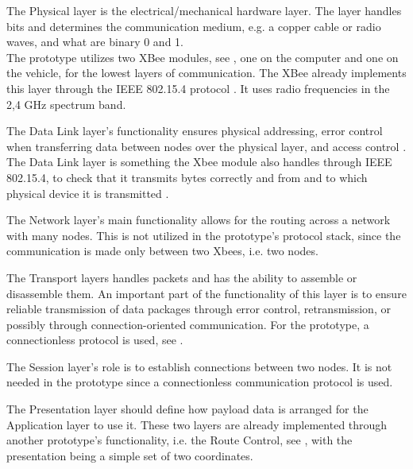 The Physical layer is the electrical/mechanical hardware layer. The layer handles bits and determines the communication medium, e.g. a copper cable or radio waves, and what are binary 0 and 1.\\The prototype utilizes two XBee modules, see , one on the computer and one on the vehicle, for the lowest layers of communication. The XBee already implements this layer through the IEEE 802.15.4 protocol \cite{Xbee,IEEE812154}. It uses radio frequencies in the 2,4 \si{GHz} spectrum band.

The Data Link layer's functionality ensures physical addressing, error control when transferring data between nodes over the physical layer, and access control \cite{J.M.Network}. The Data Link layer is something the Xbee module also handles through IEEE 802.15.4, to check that it transmits bytes correctly and from and to which physical device it is transmitted \cite{IEEE812154}.

The Network layer's main functionality allows for the routing across a network with many nodes. This is not utilized in the prototype's protocol stack, since the communication is made only between two Xbees, i.e. two nodes.

The Transport layers handles packets and has the ability to assemble or disassemble them. An important part of the functionality of this layer is to ensure reliable transmission of data packages through error control, retransmission, or possibly through connection-oriented communication. For the prototype, a connectionless protocol is used, see .

The Session layer's role is to establish connections between two nodes. It is not needed in the prototype since a connectionless communication protocol is used.

The Presentation layer should define how payload data is arranged for the Application layer to use it. These two layers are already implemented through another prototype's functionality, i.e. the Route Control, see , with the presentation being a simple set of two coordinates.


